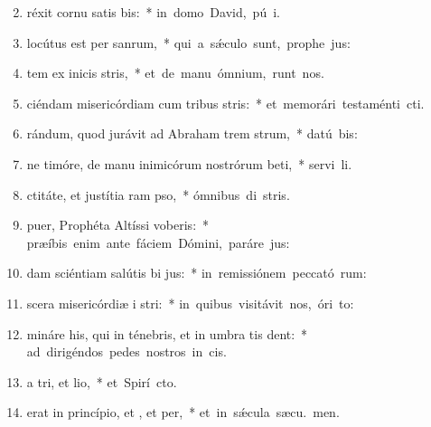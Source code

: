 \begin{flushleft}
\begin{enumerate}[leftmargin=*]
\setcounter{enumi}{1}

\item {}réxit cornu satis bis:~* \mbox{in domo David, pú i.}
\item {} locútus est per  sanrum,~* \mbox{qui a s\'{\ae}culo sunt, prophe jus:}
\item {}tem ex inicis stris,~* \mbox{et de manu ómnium,  runt nos.}
\item {}ciéndam misericórdiam cum tribus stris:~* \mbox{et memorári testaménti  cti.}
\item {}rándum, quod jurávit ad Abraham trem strum,~* \mbox{datú  bis:}
\item {}ne timóre, de manu inimicórum nostrórum beti,~* \mbox{servi li.}
\item {}ctitáte, et justítia ram pso,~* \mbox{ómnibus di stris.}
\item {} puer, Prophéta Altíssi voberis:~* \mbox{præíbis enim ante fáciem Dómini, paráre  jus:}
\item {}dam sciéntiam salútis bi jus:~* \mbox{in remissiónem peccató rum:}
\item {}scera misericórdiæ i stri:~* \mbox{in quibus visitávit nos, óri  to:}
\item {}mináre his, qui in ténebris, et in umbra tis dent:~* \mbox{ad dirigéndos pedes nostros in  cis.}
\item {}a tri, et lio,~* \mbox{et Spirí cto.}
\item {} erat in princípio, et , et per,~* \mbox{et in s\'{\ae}cula sæcu. men.}

\end{enumerate}
\end{flushleft}

